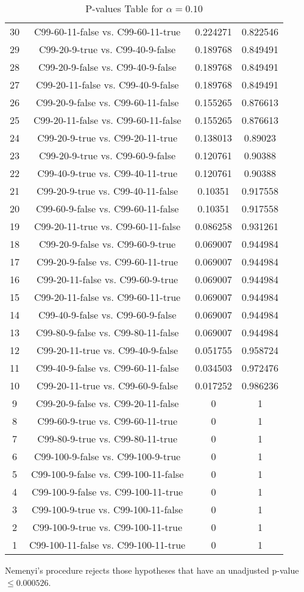 \documentclass[a4paper,10pt]{article}
\begin{document}
\begin{landscape}
\begin{table}[!htp]
\begin{tabular}{cccc}
30&C99-60-11-false vs. C99-60-11-true&0.224271&0.822546\\
29&C99-20-9-true vs. C99-40-9-false&0.189768&0.849491\\
28&C99-20-9-false vs. C99-40-9-false&0.189768&0.849491\\
27&C99-20-11-false vs. C99-40-9-false&0.189768&0.849491\\
26&C99-20-9-false vs. C99-60-11-false&0.155265&0.876613\\
25&C99-20-11-false vs. C99-60-11-false&0.155265&0.876613\\
24&C99-20-9-true vs. C99-20-11-true&0.138013&0.89023\\
23&C99-20-9-true vs. C99-60-9-false&0.120761&0.90388\\
22&C99-40-9-true vs. C99-40-11-true&0.120761&0.90388\\
21&C99-20-9-true vs. C99-40-11-false&0.10351&0.917558\\
20&C99-60-9-false vs. C99-60-11-false&0.10351&0.917558\\
19&C99-20-11-true vs. C99-60-11-false&0.086258&0.931261\\
18&C99-20-9-false vs. C99-60-9-true&0.069007&0.944984\\
17&C99-20-9-false vs. C99-60-11-true&0.069007&0.944984\\
16&C99-20-11-false vs. C99-60-9-true&0.069007&0.944984\\
15&C99-20-11-false vs. C99-60-11-true&0.069007&0.944984\\
14&C99-40-9-false vs. C99-60-9-false&0.069007&0.944984\\
13&C99-80-9-false vs. C99-80-11-false&0.069007&0.944984\\
12&C99-20-11-true vs. C99-40-9-false&0.051755&0.958724\\
11&C99-40-9-false vs. C99-60-11-false&0.034503&0.972476\\
10&C99-20-11-true vs. C99-60-9-false&0.017252&0.986236\\
9&C99-20-9-false vs. C99-20-11-false&0&1\\
8&C99-60-9-true vs. C99-60-11-true&0&1\\
7&C99-80-9-true vs. C99-80-11-true&0&1\\
6&C99-100-9-false vs. C99-100-9-true&0&1\\
5&C99-100-9-false vs. C99-100-11-false&0&1\\
4&C99-100-9-false vs. C99-100-11-true&0&1\\
3&C99-100-9-true vs. C99-100-11-false&0&1\\
2&C99-100-9-true vs. C99-100-11-true&0&1\\
1&C99-100-11-false vs. C99-100-11-true&0&1\\
\hline
\end{tabular}
\caption{P-values Table for $\alpha=0.10$}
\end{table}Nemenyi's procedure rejects those hypotheses that have an unadjusted p-value $\le0.000526$.


\end{landscape}
\end{document}
